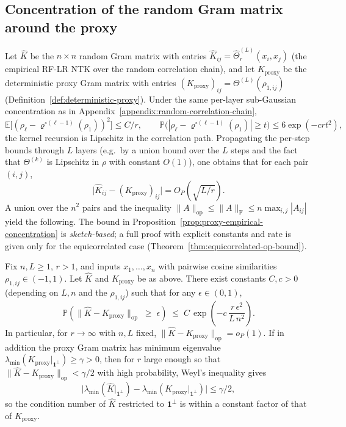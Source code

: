\subsection{Concentration of the random Gram matrix around the proxy}\label{appendix:proxy-empirical-concentration}
Let \(\hat{K}\) be the \(n\times n\) random Gram matrix with entries \(\hat{K}_{ij}=\hat{\Theta}^{(L)}_r(x_i,x_j)\) (the empirical RF-LR NTK over the random correlation chain), and let \(K_{\mathrm{proxy}}\) be the deterministic proxy Gram matrix with entries \((K_{\mathrm{proxy}})_{ij}=\Theta^{(L)}(\rho_{1,ij})\) (Definition~\ref{def:deterministic-proxy}). Under the same per-layer sub-Gaussian concentration as in Appendix~\ref{appendix:random-correlation-chain},
\[
\mathbb{E}\bigl[(\rho_\ell-\varrho^{\circ(\ell-1)}(\rho_1))^2\bigr]\le C/r,\qquad
\mathbb{P}\bigl(|\rho_\ell-\varrho^{\circ(\ell-1)}(\rho_1)|\ge t\bigr)\le 6\exp(-c r t^2),
\]
the kernel recursion is Lipschitz in the correlation path. Propagating the per-step bounds through \(L\) layers (e.g.\ by a union bound over the \(L\) steps and the fact that \(\Theta^{(k)}\) is Lipschitz in \(\rho\) with constant \(O(1)\)), one obtains that for each pair \((i,j)\),
\[
\bigl|\hat{K}_{ij}-(K_{\mathrm{proxy}})_{ij}\bigr|=O_P(\sqrt{L/r}).
\]
A union over the \(n^2\) pairs and the inequality \(\|A\|_{\mathrm{op}}\le \|A\|_{\mathrm{F}}\le n\max_{i,j}|A_{ij}|\) yield the following. The bound in Proposition~\ref{prop:proxy-empirical-concentration} is \emph{sketch-based}; a full proof with explicit constants and rate is given only for the equicorrelated case (Theorem~\ref{thm:equicorrelated-op-bound}).
\begin{proposition}\label{prop:proxy-empirical-concentration}
Fix \(n,L\ge 1\), \(r>1\), and inputs \(x_1,\ldots,x_n\) with pairwise cosine similarities \(\rho_{1,ij}\in(-1,1)\). Let \(\hat{K}\) and \(K_{\mathrm{proxy}}\) be as above. There exist constants \(C,c>0\) (depending on \(L,n\) and the \(\rho_{1,ij}\)) such that for any \(\epsilon\in(0,1)\),
\[
\mathbb{P}\!\left(\|\hat{K}-K_{\mathrm{proxy}}\|_{\mathrm{op}}\;\ge\; \epsilon\right)\;\le\; C\,\exp\!\left(-c\,\frac{r\,\epsilon^2}{L\,n^2}\right).
\]
In particular, for \(r\to\infty\) with \(n,L\) fixed, \(\|\hat{K}-K_{\mathrm{proxy}}\|_{\mathrm{op}}=o_P(1)\). If in addition the proxy Gram matrix has minimum eigenvalue \(\lambda_{\min}(K_{\mathrm{proxy}}|_{\mathbf{1}^\perp})\ge \gamma>0\), then for \(r\) large enough so that \(\|\hat{K}-K_{\mathrm{proxy}}\|_{\mathrm{op}}<\gamma/2\) with high probability, Weyl's inequality gives
\[
\bigl|\lambda_{\min}(\hat{K}|_{\mathbf{1}^\perp})-\lambda_{\min}(K_{\mathrm{proxy}}|_{\mathbf{1}^\perp})\bigr|\le \gamma/2,
\]
so the condition number of \(\hat{K}\) restricted to \(\mathbf{1}^\perp\) is within a constant factor of that of \(K_{\mathrm{proxy}}\).
\end{proposition}
